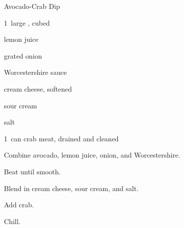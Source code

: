 \begin{recipe}{Avocado-Crab Dip}{}{}

\begin{ingredients}
\item 1~large , cubed
\item {} lemon juice
\item {} grated onion
\item {} Worcestershire sauce
\item {} cream cheese, softened
\item \C{\quarter} sour cream
\item \tp{\quarter} salt
\item 1~can crab meat, drained and cleaned
\end{ingredients}

\begin{directions}
\item Combine avocado, lemon juice, onion, and Worcestershire.
\item Beat until smooth.
\item Blend in cream cheese, sour cream, and salt.
\item Add crab.
\item Chill.
\end{directions}

\end{recipe}
